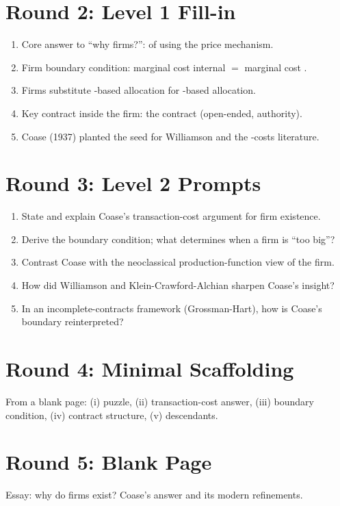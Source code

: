 \documentclass[11pt]{article}
\newcommand{\blank}[1]{\underline{\hspace{#1}}}
\begin{document}
\section*{Round 2: Level 1 Fill-in}
\begin{enumerate}
\item Core answer to ``why firms?'': \blank{3cm} of using the price mechanism.
\item Firm boundary condition: marginal cost internal $=$ marginal cost \blank{1.5cm}.
\item Firms substitute \blank{1.5cm}-based allocation for \blank{1.5cm}-based allocation.
\item Key contract inside the firm: the \blank{2cm} contract (open-ended, authority).
\item Coase (1937) planted the seed for Williamson and the \blank{2cm}-costs literature.
\end{enumerate}

\section*{Round 3: Level 2 Prompts}
\begin{enumerate}
\item State and explain Coase's transaction-cost argument for firm existence.
\item Derive the boundary condition; what determines when a firm is ``too big''?
\item Contrast Coase with the neoclassical production-function view of the firm.
\item How did Williamson and Klein-Crawford-Alchian sharpen Coase's insight?
\item In an incomplete-contracts framework (Grossman-Hart), how is Coase's boundary reinterpreted?
\end{enumerate}

\section*{Round 4: Minimal Scaffolding}
From a blank page: (i) puzzle, (ii) transaction-cost answer, (iii) boundary condition, (iv) contract structure, (v) descendants.

\section*{Round 5: Blank Page}
Essay: why do firms exist? Coase's answer and its modern refinements.
\end{document}
